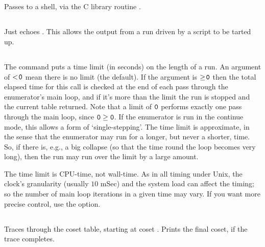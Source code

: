 \subsection{}

Passes  to a shell, via the C library routine .

\subsection{}

Just echoes .
This allows the output from a run driven by a script to be tarted up.

\subsection{}

The  command puts a time limit (in seconds) on the length of a run.
An argument of $<\!\texttt{0}$ mean there is no limit (the default).
If the argument is $\ge\!\texttt{0}$ then the total elapsed time for this
  call is checked at the end of each pass through the enumerator's main
  loop, and if it's more than the limit the run is stopped and the current
  table returned.
Note that a limit of $\texttt{0}$ performs exactly one pass through the main
  loop, since $\texttt{0} \ge \texttt{0}$.
If the enumerator is run in the continue mode, this allows a form of
  `single-stepping'\kern-1.5pt.
%
The time limit is approximate, in the sense that the enumerator may run for
  a longer, but never a shorter, time.
So, if there is, e.g., a big collapse (so that the time round the loop
  becomes very long), then the run may run over the limit by a large
  amount.

The time limit is CPU-time, not wall-time.
As in all timing under Unix, the clock's granularity (usually $10$ mSec)
  and the system load can affect the timing; so the number of main loop
  iterations in a given time may vary.
If you want more precise control, use the  option.

\subsection{}

Traces  through the coset table, starting at coset .
Prints the final coset, if the trace completes.

